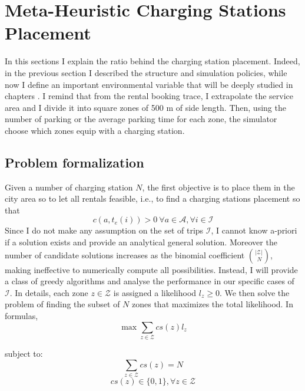 \section{Meta-Heuristic Charging Stations Placement}
In this sections I explain the ratio behind the charging station placement. Indeed, in the previous section I described the structure and simulation policies, while now I define an important environmental variable that will be deeply studied in chapters . I remind that from the rental booking trace, I extrapolate the service area and I divide it into square zones of 500 m of side length. Then, using the number of parking or the average parking time for each zone, the simulator choose which zones equip with a charging station.

\subsection{Problem formalization}
Given a number of charging station $N$, the first objective is to place them in the city area so to let all rentals feasible, i.e., to find a charging stations placement so that
\[
c(a,t_e(i))>0\ \forall a \in \mathcal{A}, \forall  i \in \mathcal{I}
\]
Since I do not make any assumption on the set of trips $\mathcal{I}$, I cannot know a-priori if a solution exists and provide an analytical general solution. Moreover the number of candidate solutions increases as the binomial coefficient ${\left\vert{\mathcal{Z}}\right\vert}\choose\ N$, making ineffective to numerically compute all possibilities. Instead, I will provide a class of greedy algorithms and analyse the performance in our specific cases of $\mathcal{I}$.
In details, each zone $z\in\mathcal{Z}$ is assigned a likelihood $l_z \geq 0$.
We then solve the problem of finding the subset of $N$ zones that maximizes the total likelihood. In formulas, 
$$\max \sum_{z\in\mathcal{Z}} cs(z)l_z$$

subject to:
$$\sum_{z\in\mathcal{Z}} cs(z) = N$$
$$cs(z)\in \{0,1\},  \forall z \in \mathcal{Z}$$

